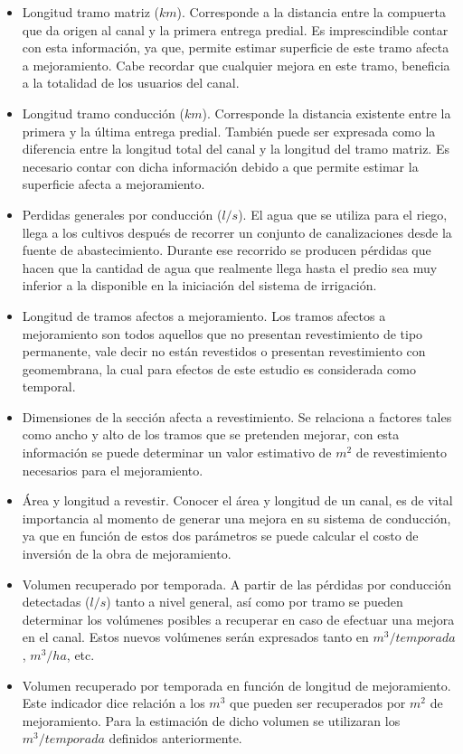 \documentclass[]{article}
\begin{document}
\begin{itemize}
\item Longitud tramo matriz ($km$). Corresponde a la distancia entre la compuerta que da origen al canal y la primera entrega predial. Es imprescindible contar con esta información, ya que, permite estimar superficie de este tramo afecta a mejoramiento. Cabe recordar que cualquier mejora en este tramo, beneficia a la totalidad de los usuarios del canal.
\item Longitud tramo conducción ($km$). Corresponde la distancia existente entre la primera y la última entrega predial. También puede ser expresada como la diferencia entre la longitud total del canal y la longitud del tramo matriz. Es necesario contar con dicha información debido a que permite estimar la superficie afecta a mejoramiento.
\item Perdidas generales por conducción ($l/s$). El agua que se utiliza para el riego, llega a los cultivos después de recorrer un conjunto de canalizaciones desde la fuente de abastecimiento. Durante ese recorrido se producen pérdidas que hacen que la cantidad de agua que realmente llega hasta el predio sea muy inferior a la disponible en la iniciación del sistema de irrigación.
\item Longitud de tramos afectos a mejoramiento. Los tramos afectos a mejoramiento son todos aquellos que no presentan revestimiento de tipo permanente, vale decir no están revestidos o presentan revestimiento con geomembrana, la cual para efectos de este estudio es considerada como temporal.
\item Dimensiones de la sección afecta a revestimiento. Se relaciona a factores tales como ancho y alto de los tramos que se pretenden mejorar, con esta información se puede determinar un valor estimativo de $m^2$ de revestimiento necesarios para el mejoramiento.
\item Área y longitud a revestir. Conocer el área y longitud de un canal, es de vital importancia al momento de generar una mejora en su sistema de conducción, ya que en función de estos dos parámetros se puede calcular el costo de inversión de la obra de mejoramiento.
\item Volumen recuperado por temporada. A partir de las pérdidas por conducción detectadas ($l/s$) tanto a nivel general, así como por tramo se pueden determinar los volúmenes posibles a recuperar en caso de efectuar una mejora en el canal. Estos nuevos volúmenes serán expresados tanto en $m^3/temporada$, $m^3/ha$, etc.
\item Volumen recuperado por temporada en función de longitud de mejoramiento. Este indicador dice relación a los $m^3$ que pueden ser recuperados por $m^2$ de mejoramiento. Para la estimación de dicho volumen se utilizaran los $m^3/temporada$ definidos anteriormente.
\end{itemize}
\end{document}
